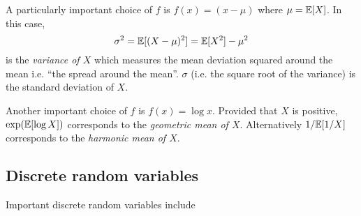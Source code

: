 A particularly important choice of $f$ is $f(x)=(x-\mu)$ where $\mu=\mathbb{E}[X]$. In this case, 
\[
\sigma^2 = \mathbb{E}[(X-\mu)^2]= \mathbb{E}[X^2]-\mu^2
\]
is the  \emph{variance of $X$} which measures the mean deviation squared around the mean i.e. ``the spread around the mean''. $\sigma$ (i.e. the square root of the variance) is the standard deviation of $X$. 

Another important choice of $f$ is $f(x)=\log x$. Provided that $X$ is positive, $\exp(\mathbb{E}[\log X])$ corresponds to the  \emph{geometric mean of $X$}. Alternatively $1/\mathbb{E}[1/X]$ corresponds to the \emph{harmonic mean of $X$}. 

\subsection*{Discrete random variables}
Important discrete random variables include

